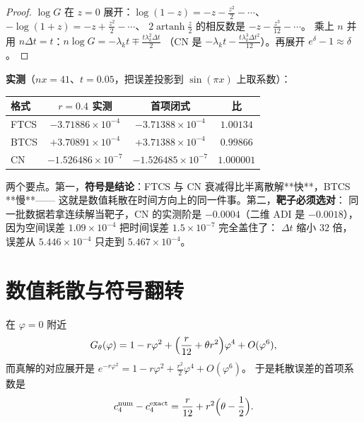 \begin{proof}
$\log G$ 在 $z=0$ 展开：$\log(1-z)=-z-\frac{z^2}2-\cdots$、
$-\log(1+z)=-z+\frac{z^2}2-\cdots$、
$2\operatorname{artanh}\frac z2$ 的相反数是 $-z-\frac{z^3}{12}-\cdots$。
乘上 $n$ 并用 $n\Delta t=t$：$n\log G=-\lambda_kt\mp\frac{t\lambda_k^2\Delta t}2$
（CN 是 $-\lambda_kt-\frac{t\lambda_k^3\Delta t^2}{12}$）。再展开 $e^{\delta}-1\approx\delta$。
\end{proof}

\textbf{实测}（$nx=41$、$t=0.05$，把误差投影到 $\sin(\pi x)$ 上取系数）：

\begin{center}
\begin{tabular}{lccc}
\toprule
格式 & $r=0.4$ 实测 & 首项闭式 & 比 \\
\midrule
FTCS & $-3.71886\times10^{-4}$ & $-3.71388\times10^{-4}$ & $1.00134$ \\
BTCS & $+3.70891\times10^{-4}$ & $+3.71388\times10^{-4}$ & $0.99866$ \\
CN   & $-1.526486\times10^{-7}$ & $-1.526485\times10^{-7}$ & $1.000001$ \\
\bottomrule
\end{tabular}
\end{center}

两个要点。第一，\textbf{符号是结论}：FTCS 与 CN 衰减得比半离散解**快**，BTCS **慢**——
这就是数值耗散在时间方向上的同一件事。第二，\textbf{靶子必须选对}：
同一批数据若拿连续解当靶子，CN 的实测阶是 $-0.0004$（二维 ADI 是 $-0.0018$），
因为空间误差 $1.09\times10^{-4}$ 把时间误差 $1.5\times10^{-7}$ 完全盖住了：
$\Delta t$ 缩小 $32$ 倍，误差从 $5.446\times10^{-4}$ 只走到 $5.467\times10^{-4}$。

\section{数值耗散与符号翻转}

\begin{theorem}[符号展开]
\label{thm:symbol}
在 $\varphi=0$ 附近
\begin{equation}
  G_\theta(\varphi)=1-r\varphi^2+\Bigl(\frac r{12}+\theta r^2\Bigr)\varphi^4+O(\varphi^6),
  \label{eq:symbol}
\end{equation}
而真解的对应展开是 $e^{-r\varphi^2}=1-r\varphi^2+\frac{r^2}2\varphi^4+O(\varphi^6)$。
于是耗散误差的首项系数是
\begin{equation}
  c_4^{\text{num}}-c_4^{\text{exact}}=\frac r{12}+r^2\Bigl(\theta-\frac12\Bigr).
  \label{eq:c4}
\end{equation}
\end{theorem}

